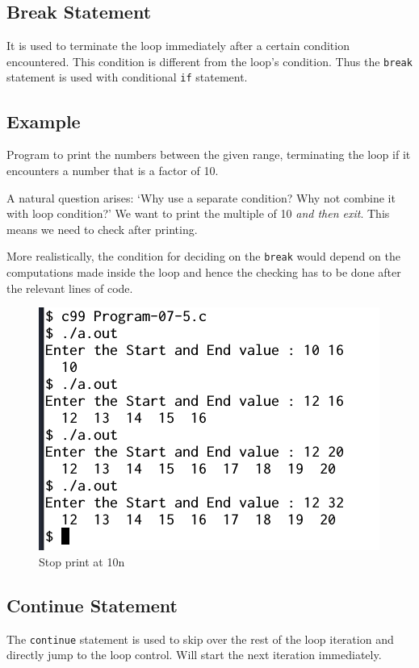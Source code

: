\documentclass[11pt,a4paper]{article}
\begin{document}
\subsection*{Break Statement}
It is used to terminate the loop immediately after a certain condition encountered. This condition is different from the loop's condition. Thus the \lstinline!break! statement is used with conditional \lstinline!if! statement.

\subsection*{Example}
Program to print the numbers between the given range, terminating the loop if it encounters a number that is a factor of 10.



A natural question arises: `Why use a separate condition? Why not combine it with loop condition?' We want to print the multiple of 10 \emph{and then exit}. This means we need to check after printing. 

More realistically, the condition for deciding on the \lstinline!break! would depend on the computations made inside the loop and hence the checking has to be done after the relevant lines of code.

\begin{figure}[ht]
\begin{center}
\includegraphics[scale=0.6]{Output-07-5.png}
\caption{Stop print at 10n}
\label{output-07-5}
\end{center}
\end{figure}

\subsection*{Continue Statement} 
The \lstinline!continue! statement is used to skip over the rest of the loop iteration and directly jump to the loop control. Will start the next iteration immediately.
\end{document}
